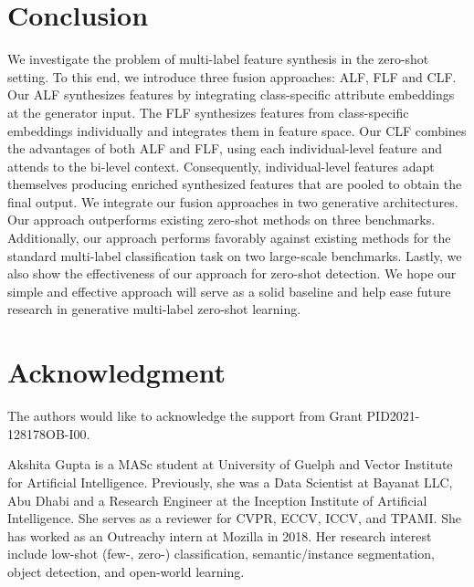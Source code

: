\documentclass[10pt,journal,compsoc]{IEEEtran}
\begin{document}
\section{Conclusion}
We investigate the problem of multi-label feature synthesis in the zero-shot setting. To this end, we introduce three fusion approaches: ALF, FLF and CLF. Our ALF synthesizes features by integrating class-specific attribute embeddings at the generator input.
The FLF synthesizes features from class-specific embeddings individually and integrates them in feature space. Our CLF combines the advantages of both ALF and FLF, using each individual-level feature and attends to the bi-level context.
Consequently, individual-level features adapt themselves producing enriched synthesized features that are pooled to obtain the final output. 
We integrate our fusion approaches in two generative architectures. Our approach outperforms existing zero-shot methods on three benchmarks. Additionally, our approach performs favorably against existing methods for the standard multi-label classification task on two large-scale benchmarks. Lastly, we also show the effectiveness of our approach for zero-shot detection. We hope our simple and effective approach will serve as a solid baseline and help ease future research in generative multi-label zero-shot learning.












\section{Acknowledgment}
The authors would like to acknowledge the support from Grant PID2021-128178OB-I00.
















{
\small


}



\begin{IEEEbiography}{Akshita Gupta}
is a MASc student at University of Guelph and Vector Institute for Artificial Intelligence. Previously, she was a Data Scientist at Bayanat LLC, Abu Dhabi and a  Research Engineer at the Inception Institute of Artificial Intelligence. She serves as a reviewer for CVPR, ECCV, ICCV, and TPAMI. She has worked as an Outreachy intern at Mozilla in 2018. Her research interest include low-shot (few-, zero-) classification, semantic/instance segmentation, object detection, and open-world learning.

\end{IEEEbiography}
\end{document}
